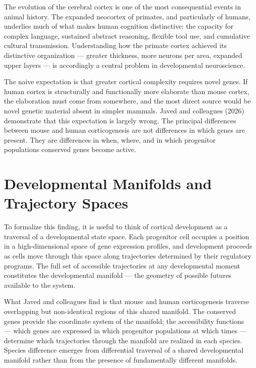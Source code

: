 \documentclass[12pt, a4paper, openany]{book}
\theoremstyle{definition}
\theoremstyle{remark}
\begin{document}
The evolution of the cerebral cortex is one of the most consequential events in animal history. The expanded neocortex of primates, and particularly of humans, underlies much of what makes human cognition distinctive: the capacity for complex language, sustained abstract reasoning, flexible tool use, and cumulative cultural transmission. Understanding how the primate cortex achieved its distinctive organization — greater thickness, more neurons per area, expanded upper layers — is accordingly a central problem in developmental neuroscience.

The naive expectation is that greater cortical complexity requires novel genes. If human cortex is structurally and functionally more elaborate than mouse cortex, the elaboration must come from somewhere, and the most direct source would be novel genetic material absent in simpler mammals. Javed and colleagues (2026) demonstrate that this expectation is largely wrong. The principal differences between mouse and human corticogenesis are not differences in which genes are present. They are differences in when, where, and in which progenitor populations conserved genes become active.

\section{Developmental Manifolds and Trajectory Spaces}

To formalize this finding, it is useful to think of cortical development as a traversal of a developmental state space. Each progenitor cell occupies a position in a high-dimensional space of gene expression profiles, and development proceeds as cells move through this space along trajectories determined by their regulatory programs. The full set of accessible trajectories at any developmental moment constitutes the developmental manifold — the geometry of possible futures available to the system.

What Javed and colleagues find is that mouse and human corticogenesis traverse overlapping but non-identical regions of this shared manifold. The conserved genes provide the coordinate system of the manifold; the accessibility functions — which genes are expressed in which progenitor populations at which times — determine which trajectories through the manifold are realized in each species. Species difference emerges from differential traversal of a shared developmental manifold rather than from the presence of fundamentally different manifolds.
\end{document}
